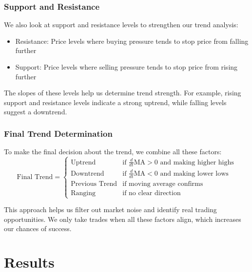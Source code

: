 \documentclass[12pt]{article}
\begin{document}
\subsubsection*{Support and Resistance}
We also look at support and resistance levels to strengthen our trend analysis:

\begin{itemize}
    \item Resistance: Price levels where buying pressure tends to stop price from falling further
    \item Support: Price levels where selling pressure tends to stop price from rising further
\end{itemize}

The slopes of these levels help us determine trend strength. For example, rising support and resistance levels indicate a strong uptrend, while falling levels suggest a downtrend.

\subsubsection*{Final Trend Determination}
To make the final decision about the trend, we combine all these factors:
\begin{equation*}
\text{Final Trend} = \begin{cases}
    \text{Uptrend} & \text{if } \frac{d}{dt}\text{MA} > 0 \text{ and making higher highs} \\
    \text{Downtrend} & \text{if } \frac{d}{dt}\text{MA} < 0 \text{ and making lower lows} \\
    \text{Previous Trend} & \text{if moving average confirms} \\
    \text{Ranging} & \text{if no clear direction}
\end{cases}
\end{equation*}

This approach helps us filter out market noise and identify real trading opportunities. We only take trades when all these factors align, which increases our chances of success.





\newpage
\section{Results}
\end{document}
